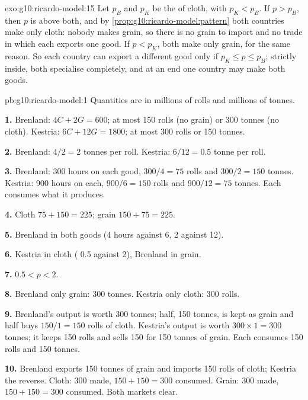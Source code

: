 \begin{solution}{exo:g10:ricardo-model:15}
Let $p_B$ and $p_K$ be the  of cloth, with $p_K < p_B$. If $p > p_B$, then $p$ is above both, and by
\cref{prop:g10:ricardo-model:pattern} both countries make only cloth: nobody makes grain, so there is no grain to import
and no trade in which each exports one good. If $p < p_K$, both make only grain, for the same reason. So each country
can export a different good only if $p_K \le p \le p_B$; strictly inside, both specialise completely, and at an end one
country may make both goods.
\end{solution}

\begin{solution}{pb:g10:ricardo-model:1}
Quantities are in millions of rolls and millions of tonnes.

\textbf{1.} Brenland: $4C + 2G = 600$; at most 150 rolls (no grain) or 300 tonnes (no cloth). Kestria: $6C + 12G =
1800$; at most 300 rolls or 150 tonnes.

\textbf{2.} Brenland: $4/2 = 2$ tonnes per roll. Kestria: $6/12 = 0.5$ tonne per roll.

\textbf{3.} Brenland: 300 hours on each good, $300/4 = 75$ rolls and $300/2 = 150$ tonnes. Kestria: 900 hours on each,
$900/6 = 150$ rolls and $900/12 = 75$ tonnes. Each consumes what it produces.

\textbf{4.} Cloth $75 + 150 = 225$; grain $150 + 75 = 225$.

\textbf{5.} Brenland in both goods (4 hours against 6, 2 against 12).

\textbf{6.} Kestria in cloth ( 0.5 against 2), Brenland in grain.

\textbf{7.} $0.5 < p < 2$.

\textbf{8.} Brenland only grain: 300 tonnes. Kestria only cloth: 300 rolls.

\textbf{9.} Brenland's output is worth 300 tonnes; half, 150 tonnes, is kept as grain and half buys $150/1 = 150$ rolls of
cloth. Kestria's output is worth $300 \times 1 = 300$ tonnes; it keeps 150 rolls and sells 150 for 150 tonnes of grain.
Each consumes 150 rolls and 150 tonnes.

\textbf{10.} Brenland exports 150 tonnes of grain and imports 150 rolls of cloth; Kestria the reverse. Cloth: 300 made,
$150 + 150 = 300$ consumed. Grain: 300 made, $150 + 150 = 300$ consumed. Both markets clear.


\end{solution}
